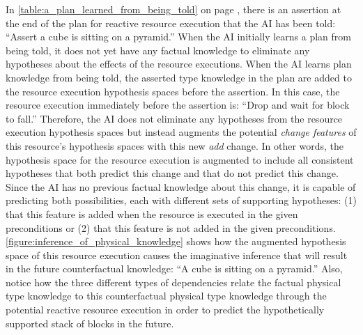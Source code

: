 In {\mbox{\autoref{table:a_plan_learned_from_being_told}}} on page
{\mbox{\pageref{table:a_plan_learned_from_being_told}}}, there is an
assertion at the end of the plan for reactive resource execution that
the AI has been told: ``Assert a cube is sitting on a pyramid.''  When
the AI initially learns a plan from being told, it does not yet have
any factual knowledge to eliminate any hypotheses about the effects of
the resource executions.  When the AI learns plan knowledge from being
told, the asserted type knowledge in the plan are added to the
resource execution hypothesis spaces before the assertion.  In this
case, the resource execution immediately before the assertion is:
``Drop and wait for block to fall.''  Therefore, the AI does not
eliminate any hypotheses from the resource execution hypothesis spaces
but instead augments the potential \emph{change features} of this
resource's hypothesis spaces with this new \emph{add} change.  In
other words, the hypothesis space for the resource execution is
augmented to include all consistent hypotheses that both predict this
change and that do not predict this change.  Since the AI has no
previous factual knowledge about this change, it is capable of
predicting both possibilities, each with different sets of supporting
hypotheses: (1) that this feature is added when the resource is
executed in the given preconditions or (2) that this feature is not
added in the given preconditions.
{\mbox{\autoref{figure:inference_of_physical_knowledge}}} shows how
the augmented hypothesis space of this resource execution causes the
imaginative inference that will result in the future counterfactual
knowledge: ``A cube is sitting on a pyramid.''  Also, notice how the
three different types of dependencies relate the factual physical type
knowledge to this counterfactual physical type knowledge through the
potential reactive resource execution in order to predict the
hypothetically supported stack of blocks in the future.
